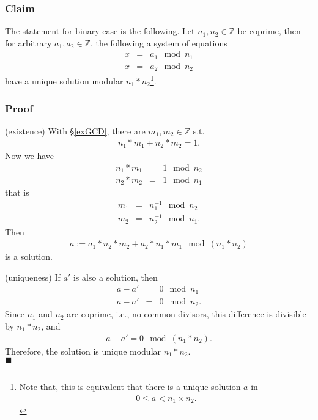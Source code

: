 \documentclass[11pt]{book}
\begin{document}
\subsubsection{Claim}
The statement for binary case is the following.
Let $n_1, n_2 \in \mathbb{Z}$ be coprime, then for arbitrary $a_1,a_2 \in \mathbb{Z}$, the following a system of equations
\begin{eqnarray}
x &=& a_1 \mod n_1\\
x &=& a_2 \mod n_2
\end{eqnarray}
have a unique solution modular $n_1*n_2$\footnote{
Note that, this is equivalent that there is a unique solution $a$ in
\begin{eqnarray}
0 \leq a < n_1\times n_2.
\end{eqnarray}
}.

\subsubsection{Proof}
(existence) With \S\ref{exGCD}, there are $m_1,m_2 \in \mathbb{Z}$ s.t.
\begin{eqnarray}
n_1 * m_1 + n_2 * m_2 = 1.
\end{eqnarray}
Now we have
\begin{eqnarray}
n_1 * m_1 &=& 1 \mod n_2 \\
n_2 * m_2 &=& 1 \mod n_1
\end{eqnarray}
that is
\begin{eqnarray}
m_1 &=& n_1^{-1} \mod n_2 \\
m_2 &=& n_2^{-1} \mod n_1.
\end{eqnarray}
Then
\begin{eqnarray}
a := a_1 * n_2 * m_2 + a_2 * n_1 * m_1 \mod (n_1*n_2)
\end{eqnarray}
is a solution.

(uniqueness)
If $a'$ is also a solution, then
\begin{eqnarray}
a - a' &=& 0 \mod n_1 \\
a - a' &=& 0 \mod n_2.
\end{eqnarray}
Since $n_1$ and $n_2$ are coprime, i.e., no common divisors, this difference is divisible by $n_1*n_2$, and
\begin{eqnarray}
a - a' = 0 \mod (n_1 * n_2).
\end{eqnarray}
Therefore, the solution is unique modular $n_1*n_2$. \\
$\blacksquare$
\end{document}
